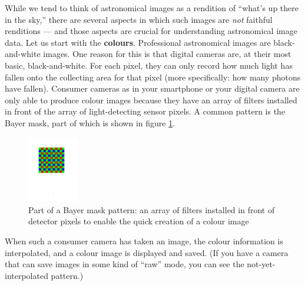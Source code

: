 \documentclass[twocolumn,apj]{openjournal}
\begin{document}
While we tend to think of astronomical images as a rendition of ``what's up there in the sky,'' there are several aspects in which such images are {\em not} faithful renditions --- and those aspects are crucial for understanding astronomical image data. Let us start with the {\bf colours}. Professional astronomical images are black-and-white images. One reason for this is that digital cameras are, at their most basic, black-and-white. For each pixel, they can only record how much light has fallen onto the collecting area for that pixel (more specifically: how many photons have fallen). Consumer cameras as in your smartphone or your digital camera are only able to produce colour images because they have an array of filters installed in front of the array of light-detecting sensor pixels. A common pattern is the Bayer mask, part of which is shown in figure \ref{BayerMask}.

\begin{figure}[htbp]
\begin{center}
\includegraphics[width=0.2\textwidth]{bayermaske.pdf}
\caption{Part of a Bayer mask pattern: an array of filters installed in front of detector pixels to enable the quick creation of a colour image }
\label{BayerMask}
\end{center}
\end{figure}
When such a consumer camera has taken an image, the colour information is interpolated, and a colour image is displayed and saved. (If you have a camera that can save images in some kind of ``raw'' mode, you can see the not-yet-interpolated pattern.)
\end{document}
